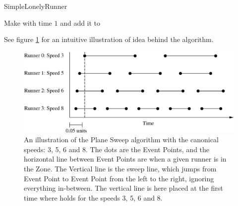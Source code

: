 \begin{algorithm}[H]
  \caption{SimpleLonelyRunner\label{simpleLonelyRunner}}
  \highlights
  
  Make \finish with time $1$ and add it to \li

  
\end{algorithm}

See figure \ref{algoIlluImg} for an intuitive illustration of idea behind the algorithm. 

\begin{figure}[H]
  \centering
  \includegraphics[width=\textwidth]{./images/algoIlluEPS}
  \caption{\label{algoIlluImg}An illustration of the Plane Sweep algorithm with the canonical speeds: 3, 5, 6 and 8. The dots are the Event Points, and the horizontal line between Event Points are when a given runner is in the Zone. The Vertical line is the sweep line, which jumps from Event Point to Event Point from the left to the right, ignoring everything in-between. The vertical line is here placed at the first time where  holds for the speeds 3, 5, 6 and 8.}
\end{figure}

